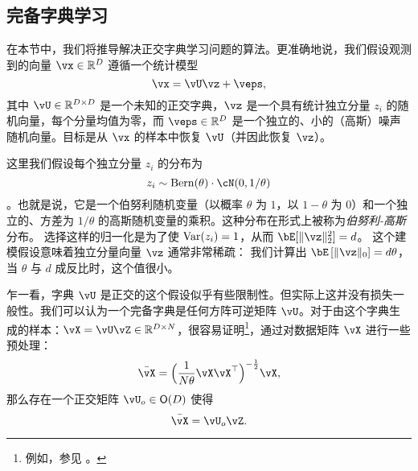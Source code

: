 \documentclass[../../book-main_zh.tex]{subfiles}
\begin{document}
\subsection{完备字典学习}
\label{sec:complete-dictionary}

在本节中，我们将推导解决正交字典学习问题的算法。更准确地说，我们假设观测到的向量 $\vx \in \R^D$ 遵循一个统计模型
\begin{equation}
    \vx = \vU \vz + \veps, 
    \label{eq:ica-model-ch2}
\end{equation}
其中 $\vU \in \R^{D \times D}$ 是一个未知的正交字典，$\vz$ 是一个具有统计独立分量 $z_i$ 的随机向量，每个分量均值为零，而 $\veps \in \R^D$ 是一个独立的、小的（高斯）噪声随机向量。目标是从 $\vx$ 的样本中恢复 $\vU$（并因此恢复 $\vz$）。

这里我们假设每个独立分量 $z_i$ 的分布为 $$z_i \sim \mathrm{Bern}(\theta) \cdot \cN(0, 1/\theta)$$。也就是说，它是一个伯努利随机变量（以概率 $\theta$ 为 $1$，以 $1-\theta$ 为 $0$）和一个独立的、方差为 $1/\theta$ 的高斯随机变量的乘积。这种分布在形式上被称为\textit{伯努利-高斯}分布。
选择这样的归一化是为了使 $\operatorname{Var}(z_i) = 1$，从而 $\bE[\norm{\vz}_2^2]=d$。
这个建模假设意味着独立分量向量 $\vz$ 通常非常稀疏：
我们计算出 $\bE\left[\norm{\vz}_0\right] = d\theta$，当 $\theta$ 与 $d$ 成反比时，这个值很小。

\begin{remark}[正交假设] 
乍一看，字典 $\vU$ 是正交的这个假设似乎有些限制性。但实际上这并没有损失一般性。我们可以认为一个完备字典是任何方阵可逆矩阵 $\vU$。对于由这个字典生成的样本：$\vX = \vU \vZ \in \mathbb{R}^{D\times N}$，很容易证明\footnote{例如，参见 \cite{sun2017completeI}。}，通过对数据矩阵 $\vX$ 进行一些预处理：
\begin{equation}
    \bar{\vX} = \Big(\frac{1}{N\theta} \vX\vX^\top\Big)^{-\frac{1}{2}}\vX,
\end{equation}
那么存在一个正交矩阵 $\vU_{o} \in \O(D)$ 使得
\begin{equation}
    \bar{\vX} = \vU_{o}\vZ.
\end{equation}
\end{remark}
\end{document}
